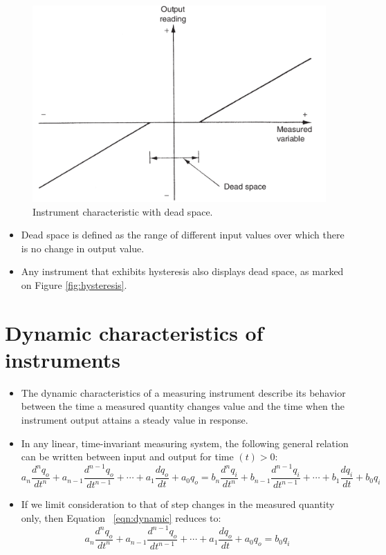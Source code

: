 \documentclass[a4paper,11pt]{book}
\begin{document}
\begin{figure}[h!]\label{fig:deadspace}
\centering
  \includegraphics[width=0.7\linewidth]{deadspace}
  \caption{Instrument characteristic with dead space.} 
\end{figure}

\begin{itemize}
\item Dead space is defined as the range of different input values over which there is no change in
output value.
\item Any instrument that exhibits hysteresis also displays dead space, as marked on Figure \ref{fig:hysteresis}.

\end{itemize}


\section*{Dynamic characteristics of instruments}

\begin{itemize}
\item The dynamic characteristics of a measuring instrument describe its behavior between the time a
measured quantity changes value and the time when the instrument output attains a steady value in
response.
\item In any linear, time-invariant measuring system, the following general relation can be written
between input and output for time $(t)>0$: 
\begin{equation}\label{eqn:dynamic}
a_n \frac{d^{n}q_o}{dt^{n}} + a_{n-1} \frac{d^{n-1}q_o}{dt^{n-1}} + \cdots + a_1 \frac{dq_o}{dt} + a_0 q_o =  b_n \frac{d^{n}q_i}{dt^{n}} + b_{n-1} \frac{d^{n-1}q_i}{dt^{n-1}} + \cdots + b_1 \frac{dq_i}{dt} + b_0 q_i 
\end{equation}
\item If we limit consideration to that of step changes in the measured quantity only, then Equation ~\ref{eqn:dynamic} reduces to:
\begin{equation}\label{eqn:dynamic-reduced}
a_n \frac{d^{n}q_o}{dt^{n}} + a_{n-1} \frac{d^{n-1}q_o}{dt^{n-1}} + \cdots + a_1 \frac{dq_o}{dt} + a_0 q_o =   b_0 q_i 
\end{equation}
\end{itemize}
\end{document}
